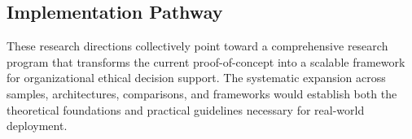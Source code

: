 \subsection{Implementation Pathway}

These research directions collectively point toward a comprehensive research program that transforms the current proof-of-concept into a scalable framework for organizational ethical decision support. The systematic expansion across samples, architectures, comparisons, and frameworks would establish both the theoretical foundations and practical guidelines necessary for real-world deployment.